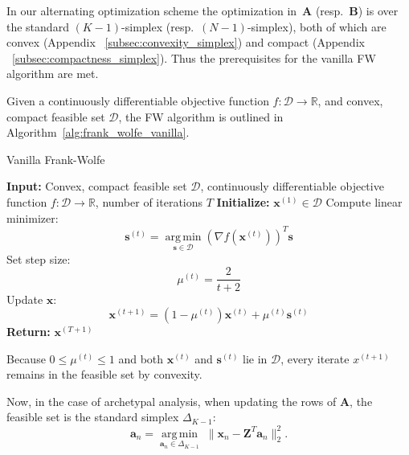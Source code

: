 \documentclass[oneside]{article}
\DeclareMathOperator*{\argmin}{arg\,min}
\begin{document}
In our alternating optimization scheme the optimization in~$\mathbf{A}$ (resp.\ $\mathbf{B}$) is over the standard $(K-1)$-simplex (resp.\ $(N-1)$-simplex), both of which are convex (Appendix ~\ref{subsec:convexity_simplex}) and compact (Appendix ~\ref{subsec:compactness_simplex}).  Thus the prerequisites for the vanilla FW algorithm are met.

Given a continuously differentiable objective function $f: \mathcal{D} \rightarrow \mathbb{R}$, and convex, compact feasible set $\mathcal{D}$, the FW algorithm is outlined in Algorithm~\ref{alg:frank_wolfe_vanilla}.

\begin{algorithm}[H]
    \caption{Vanilla Frank-Wolfe \autocite{frankAlgorithmQuadraticProgramming1956a, jaggiRevisitingFrankWolfeProjectionFree2013}}
    \label{alg:frank_wolfe_vanilla}
    \begin{algorithmic}[1]
    \State \textbf{Input:} Convex, compact feasible set $\mathcal{D}$, continuously differentiable objective function $f: \mathcal{D} \rightarrow \mathbb{R}$, number of iterations $T$
    \State \textbf{Initialize:} $\mathbf{x}^{(1)} \in \mathcal{D}$
        \State Compute linear minimizer:
        \begin{equation}
        \mathbf{s}^{(t)} = \operatorname*{arg\,min}_{\mathbf{s} \in \mathcal{D}} \left( \nabla f\left(\mathbf{x}^{(t)}\right) \right)^T \mathbf{s}
        \end{equation}
        \State Set step size:
        \begin{equation}
        \mu^{(t)} = \frac{2}{t+2}
        \end{equation}
        \State Update $\mathbf{x}$:
        \begin{equation}
        \mathbf{x}^{(t+1)} = (1-\mu^{(t)}) \mathbf{x}^{(t)} + \mu^{(t)} \mathbf{s}^{(t)}
        \end{equation}
    \EndFor
    \State \textbf{Return:} $\mathbf{x}^{(T+1)}$
    \end{algorithmic}
\end{algorithm}

Because $0 \le \mu^{(t)} \le 1$ and both $\mathbf{x}^{(t)}$ and $\mathbf{s}^{(t)}$ lie in $\mathcal{D}$, every iterate $x^{(t+1)}$ remains in the feasible set by convexity.

Now, in the case of archetypal analysis, when updating the rows of $\mathbf{A}$, the feasible set is the standard simplex $\Delta_{K-1}$:\begin{equation}
    \mathbf{a}_n = \underset{\mathbf{a}_n \in \Delta_{K-1}}{\argmin} \;\|\mathbf{x}_n - \mathbf{Z}^T \mathbf{a}_n\|_2^2.
\end{equation}
\end{document}
